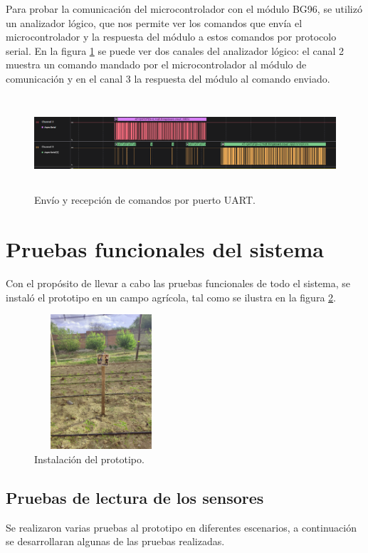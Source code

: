 Para probar la comunicación del microcontrolador con el módulo BG96, se utilizó un analizador lógico, que nos permite ver los comandos que envía el microcontrolador y la respuesta del módulo a estos comandos por protocolo serial.
En la figura \ref{fig:trama uart1} se puede ver dos canales del analizador  lógico: el canal 2 muestra un comando mandado por el microcontrolador al módulo de comunicación y en el canal 3 la respuesta del módulo al comando enviado.

\begin{figure}[h!]
  \centering
    \includegraphics[width=\linewidth, height=3.5cm]{./Figures/trama_uart1.png}
  \caption{Envío y recepción de comandos por puerto UART.}
    \label{fig:trama uart1}
\end{figure}

\section{Pruebas funcionales del sistema}
Con el propósito de llevar a cabo las pruebas funcionales de todo el sistema, se instaló el prototipo en un campo agrícola, tal como se ilustra en la figura \ref{fig:Condicionales ambientales prueba 1}.
\begin{figure}[h!]
  \centering
    \includegraphics[width=5cm, height=5cm]{./Figures/prototipo_implementacion.png}
  \caption{Instalación del prototipo.}
    \label{fig:Condicionales ambientales prueba 1}
\end{figure}
  
\subsection{Pruebas de lectura de los sensores}
Se realizaron varias pruebas al prototipo en diferentes escenarios, a continuación se desarrollaran algunas de las pruebas realizadas.
